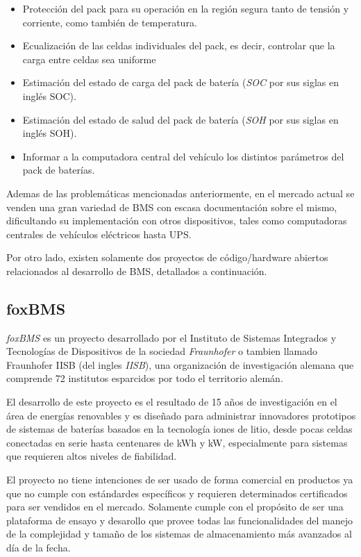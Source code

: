 \documentclass[10pt, a4paper]{report}
\begin{document}
\begin{itemize}
    \item Protección del pack para su operación en la región segura tanto 
        de tensión y corriente, como también de temperatura.
    \item Ecualización de las celdas individuales del pack, es decir,
        controlar que la carga entre celdas sea uniforme
    \item Estimación del estado de carga del pack de batería 
        (\emph{\acrshort{SOC}} por sus siglas en ingl\'es \acrlong{SOC}).
    \item Estimación del estado de salud del pack de batería 
        (\emph{\acrshort{SOH}} por sus siglas en ingl\'es \acrlong{SOH}).
    \item Informar a la computadora central del vehículo los distintos 
        parámetros del pack de baterías.
\end{itemize}

\noindent Ademas de las problem\'aticas mencionadas anteriormente, en el mercado
actual se venden una gran variedad de \acrshort{BMS} con escasa documentaci\'on
sobre el mismo, dificultando su implementaci\'on con otros dispositivos, tales 
como computadoras centrales de veh\'iculos el\'ectricos hasta \acrshort{UPS}.

Por otro lado, existen solamente dos proyectos de c\'odigo/hardware abiertos
relacionados al desarrollo de \acrshort{BMS}, detallados a continuaci\'on.

\subsection{foxBMS}

\emph{foxBMS} \cite{foxbms} es un proyecto desarrollado por el Instituto de Sistemas
Integrados y Tecnolog\'ias de Dispositivos de la sociedad \emph{Fraunhofer} o
tambien llamado Fraunhofer IISB (del ingles \emph{\acrlong{IISB}}), una
organización de investigación alemana que comprende 72 institutos esparcidos por
todo el territorio alem\'an.

\noindent El desarrollo de este proyecto es el resultado de 15 años de
investigaci\'on en el \'area de energ\'ias renovables y es diseñado para 
administrar innovadores prototipos de sistemas de bater\'ias basados en la 
tecnolog\'ia iones de litio, desde pocas celdas conectadas en serie hasta 
centenares de kWh y kW, especialmente para sistemas que requieren altos niveles 
de fiabilidad.

\noindent El proyecto no tiene intenciones de ser usado de forma comercial en
productos ya que no cumple con estándardes espec\'ificos y requieren determinados
certificados para ser vendidos en el mercado. Solamente cumple con el 
prop\'osito de ser una plataforma de ensayo y desarollo que provee todas las 
funcionalidades del manejo de la complejidad y tamaño de los sistemas de 
almacenamiento más avanzados al d\'ia de la fecha.
\end{document}
